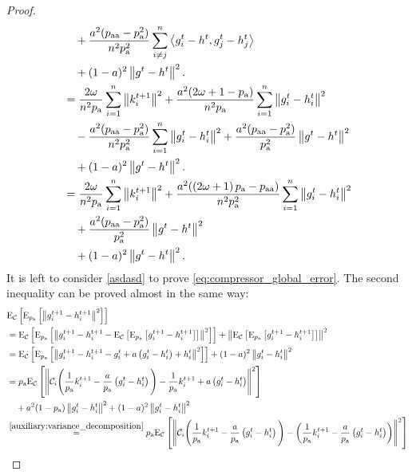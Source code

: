 \documentclass{article}
\newcommand*{\probavailable}{\ensuremath{p_{\textnormal{a}}}}
\newcommand*{\probpairaa}{\ensuremath{p_{\textnormal{aa}}}}
\begin{document}
\begin{proof}
\begin{align*}
    &\quad +\frac{a^2 (\probpairaa - \probavailable^2)}{n^2 \probavailable^2}\sum_{i \neq j}^n\inp{g^{t}_i - h^{t}}{g^{t}_j - h^{t}_j} \\
    &\quad + (1 - a)^2\norm{g^{t} - h^{t}}^2.\\
    &=\frac{2 \omega}{n^2 \probavailable}\sum_{i=1}^n\norm{k^{t+1}_i}^2 +\frac{a^2 (2 \omega + 1 - \probavailable)}{n^2 \probavailable}\sum_{i=1}^n\norm{g^{t}_i - h^{t}_i}^2 \\
    &\quad -\frac{a^2 (\probpairaa - \probavailable^2)}{n^2 \probavailable^2}\sum_{i=1}^n\norm{g^{t}_i - h^{t}_i}^2 + \frac{a^2 (\probpairaa - \probavailable^2)}{\probavailable^2}\norm{g^{t} - h^{t}}^2 \\
    &\quad + (1 - a)^2\norm{g^{t} - h^{t}}^2.\\
    &=\frac{2 \omega}{n^2 \probavailable}\sum_{i=1}^n\norm{k^{t+1}_i}^2 +\frac{a^2 (\left(2 \omega + 1\right)\probavailable - \probpairaa)}{n^2 \probavailable^2}\sum_{i=1}^n\norm{g^{t}_i - h^{t}_i}^2 \\
    &\quad + \frac{a^2 (\probpairaa - \probavailable^2)}{\probavailable^2}\norm{g^{t} - h^{t}}^2 \\
    &\quad + (1 - a)^2\norm{g^{t} - h^{t}}^2.\\
  \end{align*}
  It is left to consider \eqref{asdasd} to prove \eqref{eq:compressor_global_error}. The second inequality can be proved almost in the same way:
  \begin{align*}
    &\ExpSub{\cC}{\ExpSub{\probavailable}{\norm{g^{t+1}_i - h^{t+1}_i}^2}} \\
    &=\ExpSub{\cC}{\ExpSub{\probavailable}{\norm{g^{t+1}_i - h^{t+1}_i - \ExpSub{\cC}{\ExpSub{\probavailable}{g^{t+1}_i - h^{t+1}_i}}}^2}} + \norm{\ExpSub{\cC}{\ExpSub{\probavailable}{g^{t+1}_i - h^{t+1}_i}}}^2 \\
    &=\ExpSub{\cC}{\ExpSub{\probavailable}{\norm{g^{t+1}_i - h^{t+1}_i - g^{t}_i + a \left(g^{t}_i - h^{t}_i\right) + h^{t}_i}^2}} + (1 - a)^2\norm{g^{t}_i - h^{t}_i}^2 \\
    &=\probavailable\ExpSub{\cC}{\norm{\cC_i\Bigg(\frac{1}{\probavailable}k^{t+1}_i - \frac{a}{\probavailable} \left(g^{t}_i - h^{t}_i\right)\Bigg) - \frac{1}{\probavailable}k^{t+1}_i + a \left(g^{t}_i - h^{t}_i\right)}^2} \\
    &\quad + a^2(1 - \probavailable)\norm{g^{t}_i - h^{t}_i}^2 + (1 - a)^2\norm{g^{t}_i - h^{t}_i}^2 \\
    &\overset{\eqref{auxiliary:variance_decomposition}}{=}\probavailable\ExpSub{\cC}{\norm{\cC_i\Bigg(\frac{1}{\probavailable}k^{t+1}_i - \frac{a}{\probavailable} \left(g^{t}_i - h^{t}_i\right)\Bigg) - \left(\frac{1}{\probavailable}k^{t+1}_i - \frac{a}{\probavailable} \left(g^{t}_i - h^{t}_i\right)\right)}^2} \\

\end{align*}
\end{proof}
\end{document}
